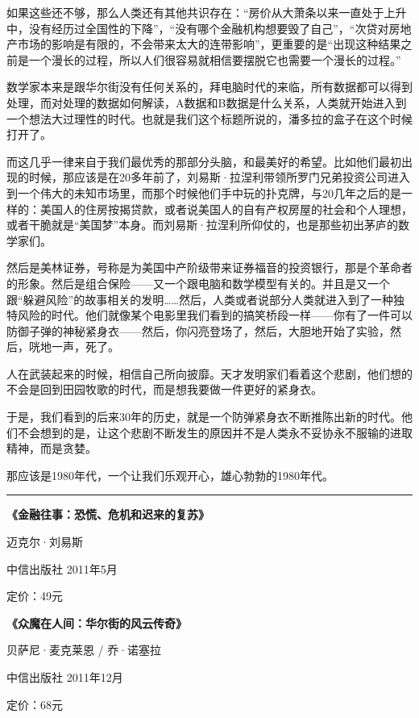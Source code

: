 如果这些还不够，那么人类还有其他共识存在：``房价从大萧条以来一直处于上升中，没有经历过全国性的下降''，``没有哪个金融机构想要毁了自己''，``次贷对房地产市场的影响是有限的，不会带来太大的连带影响''，更重要的是``出现这种结果之前是一个漫长的过程，所以人们很容易就相信要摆脱它也需要一个漫长的过程。''

数学家本来是跟华尔街没有任何关系的，拜电脑时代的来临，所有数据都可以得到处理，而对处理的数据如何解读，A数据和B数据是什么关系，人类就开始进入到一个想法大过理性的时代。也就是我们这个标题所说的，潘多拉的盒子在这个时候打开了。

而这几乎一律来自于我们最优秀的那部分头脑，和最美好的希望。比如他们最初出现的时候，那应该是在20多年前了，刘易斯·拉涅利带领所罗门兄弟投资公司进入到一个伟大的未知市场里，而那个时候他们手中玩的扑克牌，与20几年之后的是一样的：美国人的住房按揭贷款，或者说美国人的自有产权房屋的社会和个人理想，或者干脆就是``美国梦''本身。而刘易斯·拉涅利所仰仗的，也是那些初出茅庐的数学家们。

然后是美林证券，号称是为美国中产阶级带来证券福音的投资银行，那是个革命者的形象。然后是组合保险------又一个跟电脑和数学模型有关的。并且是又一个跟``躲避风险''的故事相关的发明\ldots\ldots 然后，人类或者说部分人类就进入到了一种独特风险的时代。他们就像某个电影里我们看到的搞笑桥段一样------你有了一件可以防御子弹的神秘紧身衣------然后，你闪亮登场了，然后，大胆地开始了实验，然后，咣地一声，死了。

人在武装起来的时候，相信自己所向披靡。天才发明家们看着这个悲剧，他们想的不会是回到田园牧歌的时代，而是想我要做一件更好的紧身衣。

于是，我们看到的后来30年的历史，就是一个防弹紧身衣不断推陈出新的时代。他们不会想到的是，让这个悲剧不断发生的原因并不是人类永不妥协永不服输的进取精神，而是贪婪。

那应该是1980年代，一个让我们乐观开心，雄心勃勃的1980年代。

\begin{center}\rule{0.5\linewidth}{0.5pt}\end{center}

\textbf{《金融往事：恐慌、危机和迟来的复苏》}

迈克尔·刘易斯

中信出版社 2011年5月

定价：49元

\textbf{《众魔在人间：华尔街的风云传奇》}

贝萨尼·麦克莱恩 / 乔·诺塞拉

中信出版社 2011年12月

定价：68元


